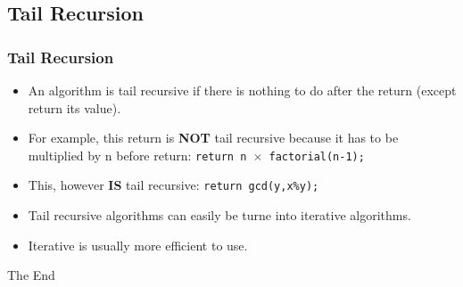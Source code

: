 \documentclass{beamer}
\begin{document}
\subsection{Tail Recursion}
\begin{frame}
\frametitle{Tail Recursion}
\begin{itemize}
\item An algorithm is {\color{green} tail recursive} if there is nothing to do after the return (except return its value).
\item For example, this return is \textbf{NOT} {\color{green} tail recursive} because it has to be multiplied by n before return:
\texttt{return n $\times$ factorial(n-1);}
\item This, however \textbf{IS} {\color{green} tail recursive}: \texttt{return gcd(y,x\%y);}
\item {\color{green} Tail recursive} algorithms can easily be turne into {\color{red} iterative} algorithms.
\item {\color{red} Iterative} is usually more efficient to use.
\end{itemize}
\end{frame}

\begin{frame}
\Huge{\centerline{The End}}
\end{frame}
\end{document}
